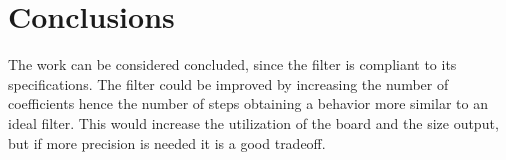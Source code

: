 \section{Conclusions}
The work can be considered concluded, since the filter is compliant to its specifications. The filter could be improved by increasing the number of coefficients hence the number of steps obtaining a behavior more similar to an ideal filter. This would increase the utilization of the board and the size output, but if more precision is needed it is a good tradeoff.